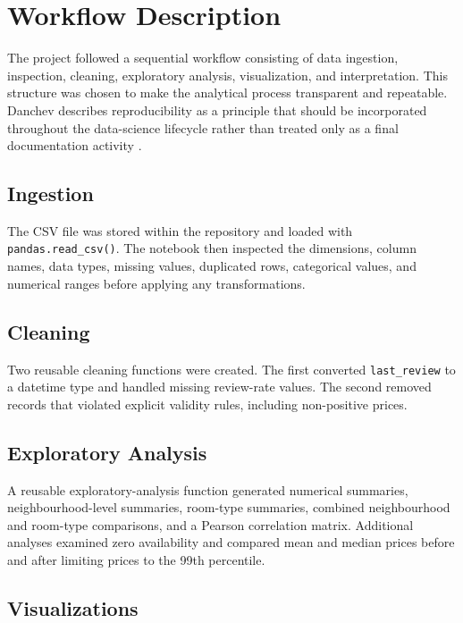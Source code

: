 \section{Workflow Description}

The project followed a sequential workflow consisting of data ingestion,
inspection, cleaning, exploratory analysis, visualization, and interpretation.
This structure was chosen to make the analytical process transparent and
repeatable. Danchev describes reproducibility as a principle that should be
incorporated throughout the data-science lifecycle rather than treated only as
a final documentation activity \parencite{danchev2022}.

\subsection{Ingestion}

The CSV file was stored within the repository and loaded with
\texttt{pandas.read\_csv()}. The notebook then inspected the dimensions, column
names, data types, missing values, duplicated rows, categorical values, and
numerical ranges before applying any transformations.

\subsection{Cleaning}

Two reusable cleaning functions were created. The first converted
\texttt{last\_review} to a datetime type and handled missing review-rate values.
The second removed records that violated explicit validity rules, including
non-positive prices.

\subsection{Exploratory Analysis}

A reusable exploratory-analysis function generated numerical summaries,
neighbourhood-level summaries, room-type summaries, combined neighbourhood
and room-type comparisons, and a Pearson correlation matrix. Additional
analyses examined zero availability and compared mean and median prices before
and after limiting prices to the 99th percentile.

\subsection{Visualizations}

